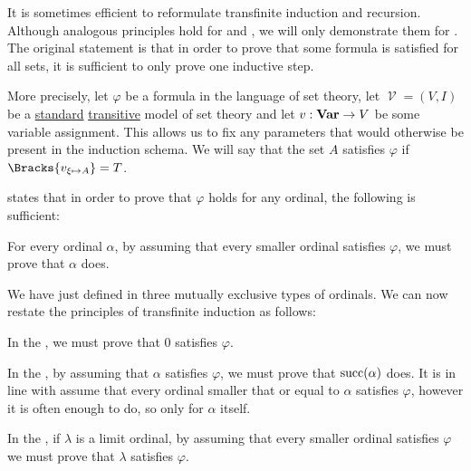 \begin{remark}\label{rem:transfinite_induction}
  It is sometimes efficient to reformulate transfinite induction and recursion. Although analogous principles hold for  and , we will only demonstrate them for . The original statement is that in order to prove that some formula is satisfied for all sets, it is sufficient to only prove one inductive step.

  More precisely, let \( \varphi \) be a formula in the language of set theory, let \( \mscrV = (V, I) \) be a \hyperref[rem:standard_model_of_set_theory]{standard} \hyperref[rem:transitive_model_of_set_theory]{transitive} model of set theory and let \( v: \operatorname{\mathbf{Var}} \to V \) be some variable assignment. This allows us to fix any parameters that would otherwise be present in the induction schema. We will say that the set \( A \) satisfies \( \varphi \) if \( \Bracks{v_{\xi \mapsto A}} = T \).

   states that in order to prove that \( \varphi \) holds for any ordinal, the following is sufficient:
  \begin{thmenum}[series=rem:transfinite_induction]
     For every ordinal \( \alpha \), by assuming that every smaller ordinal satisfies \( \varphi \), we must prove that \( \alpha \) does.
  \end{thmenum}

  We have just defined in  three mutually exclusive types of ordinals. We can now restate the principles of transfinite induction as follows:
  \begin{thmenum}[resume=rem:transfinite_induction]
     In the , we must prove that \( 0 \) satisfies \( \varphi \).

     In the , by assuming that \( \alpha \) satisfies \( \varphi \), we must prove that \( \operatorname{succ}(\alpha) \) does. It is in line with  assume that every ordinal smaller that or equal to \( \alpha \) satisfies \( \varphi \), however it is often enough to do, so only for \( \alpha \) itself.

     In the , if \( \lambda \) is a limit ordinal, by assuming that every smaller ordinal satisfies \( \varphi \) we must prove that \( \lambda \) satisfies \( \varphi \).
  \end{thmenum}


\end{remark}
